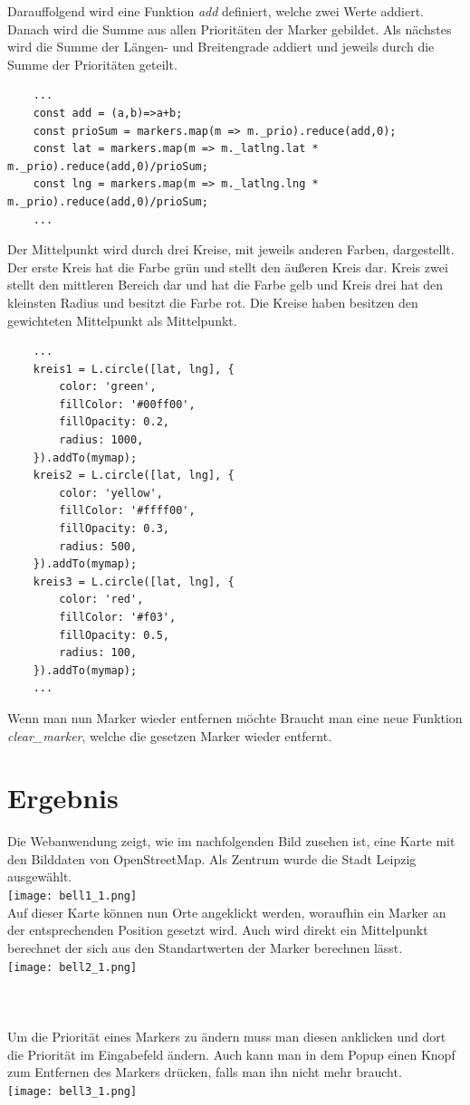 \documentclass[a4paper, twoside, 12pt]{scrreprt}
\begin{document}
Darauffolgend wird eine Funktion \textit{add} definiert, welche zwei Werte addiert. Danach wird die Summe aus allen Prioritäten der Marker gebildet. Als nächstes wird die Summe der Längen- und Breitengrade addiert und jeweils durch die Summe der Prioritäten geteilt.
\begin{lstlisting}
	...
	const add = (a,b)=>a+b;
	const prioSum = markers.map(m => m._prio).reduce(add,0);
	const lat = markers.map(m => m._latlng.lat * m._prio).reduce(add,0)/prioSum;
	const lng = markers.map(m => m._latlng.lng * m._prio).reduce(add,0)/prioSum;
	...
\end{lstlisting}
Der Mittelpunkt wird durch drei Kreise, mit jeweils anderen Farben, dargestellt.
Der erste Kreis hat die Farbe grün und stellt den äußeren Kreis dar.
Kreis zwei stellt den mittleren Bereich dar und hat die Farbe gelb und Kreis drei hat den kleinsten Radius und besitzt die Farbe rot.
Die Kreise haben besitzen den gewichteten Mittelpunkt als Mittelpunkt.
\begin{lstlisting}
	...
	kreis1 = L.circle([lat, lng], {
		color: 'green',
		fillColor: '#00ff00',
		fillOpacity: 0.2,
		radius: 1000,
	}).addTo(mymap);
	kreis2 = L.circle([lat, lng], {
		color: 'yellow',
		fillColor: '#ffff00',
		fillOpacity: 0.3,
		radius: 500,
	}).addTo(mymap);
	kreis3 = L.circle([lat, lng], {
		color: 'red',
		fillColor: '#f03',
		fillOpacity: 0.5,
		radius: 100,
	}).addTo(mymap);
	...
\end{lstlisting}
Wenn man nun Marker wieder entfernen möchte Braucht man eine neue Funktion \textit{clear\_marker}, welche die gesetzen Marker wieder entfernt.
\chapter{Ergebnis}
Die Webanwendung zeigt, wie im nachfolgenden Bild zusehen ist, eine Karte mit den Bilddaten von OpenStreetMap. Als Zentrum wurde die Stadt Leipzig ausgewählt.\\
\texttt{[image: bell1\_1.png]}\\
Auf dieser Karte können nun Orte angeklickt werden, woraufhin ein Marker an der entsprechenden Position gesetzt wird. Auch wird direkt ein Mittelpunkt berechnet der sich aus den Standartwerten der Marker berechnen lässt.\\
\texttt{[image: bell2\_1.png]}\\\\\\\\
Um die Priorität eines Markers zu ändern muss man diesen anklicken und dort die Priorität im Eingabefeld ändern. Auch kann man in dem Popup einen Knopf zum Entfernen des Markers drücken, falls man ihn nicht mehr braucht.\\
\texttt{[image: bell3\_1.png]}\\
\end{document}
